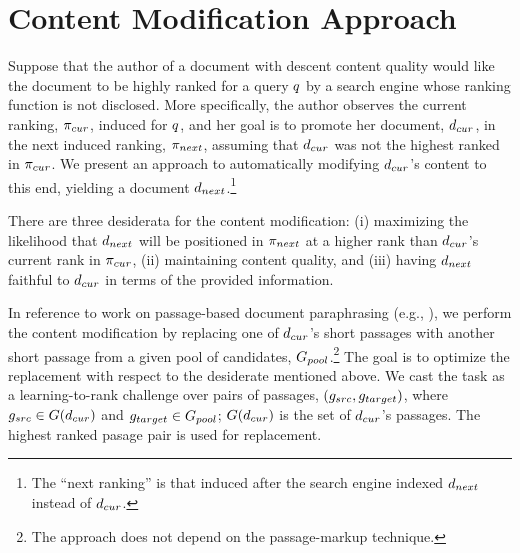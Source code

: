 \section{Content Modification Approach}
\label{sec:framework}
Suppose that the author of a document with descent content quality would like the document to be highly ranked for a
query $q$ by a search engine whose ranking function is not
disclosed. More specifically, the author observes the current ranking,
$\pi_{cur}$, induced for $q$, and her goal is to promote her
document, $d_{cur}$, in the next induced ranking, $\pi_{next}$,
assuming that $d_{cur}$ was not the highest ranked in $\pi_{cur}$. We
present an approach to automatically modifying $d_{cur}$'s content to
this end, yielding a document $d_{next}$.\footnote{The ``next ranking''
  is that induced after the search engine indexed
  $d_{next}$ instead of $d_{cur}$.}

There are three desiderata for the content modification: (i) maximizing the likelihood that $d_{next}$ will be
positioned in $\pi_{next}$ at a higher rank than $d_{cur}$'s current
rank in $\pi_{cur}$, (ii) maintaining content quality, 
and (iii) having $d_{next}$ faithful to $d_{cur}$ in
terms of the provided information.


In reference to work on passage-based document paraphrasing (e.g.,
\citet{Barzilay+Lee:03a}), we perform the content modification by
replacing one of $d_{cur}$'s short passages with another short passage from
a given pool of candidates, $G_{pool}$.\footnote{The approach does not depend on the passage-markup technique.} The goal is to optimize the replacement with respect to the desiderate mentioned above.
We cast the task as a learning-to-rank challenge \cite{Liu:11a} over pairs of passages, $(g_{src},g_{target})$,
where $g_{src} \in G(d_{cur})$ and $g_{target} \in G_{pool}$;
$G(d_{cur})$ is the set of $d_{cur}$'s passages. The highest ranked pasage pair is used for replacement. 

